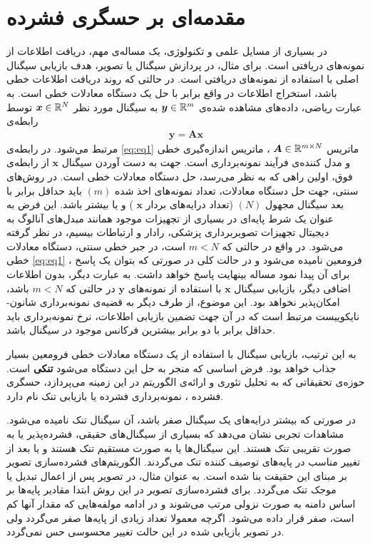 \section{مقدمه‌ای بر حسگری فشرده}
در بسیاری از مسایل علمی و تکنولوژی، یک مساله‌ی مهم، دریافت اطلاعات از نمونه‌های دریافتی است. برای مثال، در پردازش سیگنال یا تصویر، هدف بازیابی سیگنال اصلی با استفاده از نمونه‌های دریافتی است. در حالتی که روند دریافت اطلاعات خطی باشد، استخراج اطلاعات در واقع برابر با حل یک دستگاه معادلات خطی است. به عبارت ریاضی، داده‌های مشاهده شده‌ی 
$\bm{y}\in \mathbb{R}^{m}$
به سیگنال مورد نظر 
$\bm{x}\in \mathbb{R}^{N}$
توسط رابطه‌ی 
\begin{align}
\label{eq:eq1}
\bm{y}=\bm{A}\bm{x}
\end{align}
مرتبط می‌شود. در رابطه‌ی
\eqref{eq:eq1}
ماتریس
$\bm{A}\in \mathbb{R}^{m\times N}$
، ماتریس اندازه‌گیری خطی و مدل کننده‌ی  فرآیند نمونه‌برداری است. جهت به دست آوردن سیگنال 
$\bm{x}$
از رابطه‌ی فوق، اولین راهی که به نظر می‌رسد، حل دستگاه معادلات خطی است. در روش‌های سنتی،‌ جهت حل دستگاه معادلات،  تعداد نمونه‌های اخذ شده 
$(m)$
باید حداقل برابر با بعد سیگنال مجهول 
$(N)$
(تعداد درایه‌های بردار 
$\bm{x}$
) و یا بیشتر باشد. این فرض به عنوان یک شرط پایه‌ای در بسیاری از تجهیزات موجود همانند مبدل‌های آنالوگ به دیجیتال 
تجهیزات تصویربرداری پزشکی، رادار و ارتباطات بیسیم،‌ در نظر گرفته می‌شود. در واقع در حالتی که 
$m<N$
است، در جبر خطی سنتی، دستگاه معادلات خطی 
\eqref{eq:eq1}
، فرومعین
نامیده می‌شود و در حالت کلی در صورتی که بتوان یک پاسخ برای آن پیدا نمود مساله بینهایت پاسخ خواهد داشت.  به عبارت دیگر، بدون اطلاعات اضافی دیگر، بازیابی سیگنال 
$\bm{x}$
با استفاده از نمونه‌های
$\bm{y}$
در حالتی که 
$m<N$
باشد، امکان‌پذیر نخواهد بود. این موضوع، از طرف دیگر به قضیه‌ی نمونه‌برداری شانون-نایکوییست
مرتبط است که در آن جهت تضمین بازیابی اطلاعات، نرخ نمونه‌برداری باید حداقل برابر با دو برابر بیشترین فرکانس موجود در سیگنال باشد.


به این ترتیب، بازیابی سیگنال با استفاده از یک دستگاه معادلات خطی فرومعین بسیار جذاب خواهد بود. فرض اساسی که منجر به حل این دستگاه می‌شود 
\textbf{تنکی}
است. حوزه‌ی تحقیقاتی که به تحلیل تئوری و ارائه‌ی الگوریتم در این زمینه می‌پردازد، حسگری فشرده
، نمونه‌برداری فشرده
یا بازیابی تنک
نام دارد. 

در صورتی که بیشتر درایه‌های یک سیگنال صفر باشد، آن سیگنال تنک نامیده می‌شود. مشاهدات تجربی نشان می‌دهد که بسیاری از سیگنال‌های حقیقی، فشرده‌پذیر یا به صورت تقریبی تنک هستند. این سیگنال‌ها یا به صورت مستقیم تنک هستند و یا بعد از تغییر مناسب در پایه‌های توصیف کننده تنک می‌گردند. الگوریتم‌های فشرده‌سازی تصویر بر مبنای این حقیقت بنا شده است. به عنوان مثال، در 
تصویر پس از اعمال تبدیل 
یا موجک تنک می‌گردد. برای فشرده‌سازی تصویر در این روش ابتدا مقادیر پایه‌ها بر اساس دامنه به صورت نزولی مرتب می‌شوند و در ادامه مولفه‌هایی که مقدار آنها کم است، صفر قرار داده می‌شود. اگرچه معمولا تعداد زیادی از پایه‌ها صفر می‌گردد ولی در تصویر بازیابی شده در این حالت تغییر محسوسی حس نمی‌گردد.

